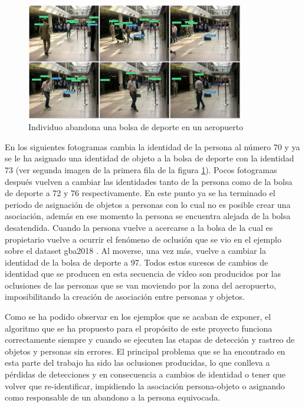 \begin{figure}[ht]
\centering
\includegraphics[width=0.85\textwidth]{img/chapters/resultados/abandono/4.png}
\caption{\label{fig:results4}Individuo abandona una bolsa de deporte en un aeropuerto \cite{pets2007-dataset}}
\end{figure}

En los siguientes fotogramas cambia la identidad de la persona al número 70 y ya se le ha asignado una identidad de objeto a la bolsa de deporte con la identidad 73 (ver segunda imagen de la primera fila de la figura \ref{fig:results4}). Pocos fotogramas después vuelven a cambiar las identidades tanto de la persona como de la bolsa de deporte a 72 y 76 respectivamente. En este punto ya se ha terminado el periodo de asignación de objetos a personas con lo cual no es posible crear una asociación, además en ese momento la persona se encuentra alejada de la bolsa desatendida. Cuando la persona vuelve a acercarse a la bolsa de la cual es propietario vuelve a ocurrir el fenómeno de oclusión que se vio en el ejemplo sobre el dataset \gls{gba2018} \cite{gba-dataset}. Al moverse, una vez más, vuelve a cambiar la identidad de la bolsa de deporte a 97. Todos estos sucesos de cambios de identidad que se producen en esta secuencia de vídeo son producidos por las oclusiones de las personas que se van moviendo por la zona del aeropuerto, imposibilitando la creación de asociación entre personas y objetos.

Como se ha podido observar en los ejemplos que se acaban de exponer, el algoritmo que se ha propuesto para el propósito de este proyecto funciona correctamente siempre y cuando se ejecuten las etapas de detección y rastreo de objetos y personas sin errores. El principal problema que se ha encontrado en esta parte del trabajo ha sido las oclusiones producidas, lo que conlleva a pérdidas de detecciones y en consecuencia a cambios de identidad o tener que volver que re-identificar, impidiendo la asociación persona-objeto o asignando como responsable de un abandono a la persona equivocada.

